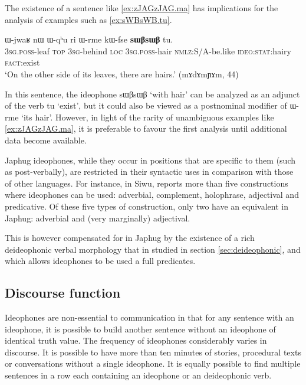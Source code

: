 \documentclass[oldfontcommands,oneside,a4paper,11pt]{article}
\newcommand{\ipa}[1]{{\phon \mbox{#1}}} %
\begin{document}
The existence of a sentence like \ref{ex:zJAGzJAG.ma}  has implications for the analysis of examples such as \ref{ex:sWBsWB.tu}.
    \begin{exe}
\ex \label{ex:sWBsWB.tu}
\gll 
   \ipa{ɯ-jwaʁ} 	\ipa{nɯ} 	\ipa{ɯ-qʰu} 	\ipa{ri} 	\ipa{ɯ-rme} 	\ipa{kɯ-fse} 	\ipa{\textbf{sɯβsɯβ}} 	\ipa{tu.} \\
   \textsc{3sg.poss}-leaf \textsc{top} \textsc{3sg}-behind \textsc{loc}    \textsc{3sg.poss}-hair \textsc{nmlz}:S/A-be.like \textsc{ideo:stat}:hairy \textsc{fact}:exist    \\
\glt `On the other side of its leaves, there are hairs.' (mɤdɤmɲɤm, 44)
\end{exe}

In this sentence, the ideophone \ipa{sɯβsɯβ}  `with hair' can be analyzed as an adjunct of the verb \ipa{tu} `exist', but it could also be viewed as a postnominal modifier of 	\ipa{ɯ-rme}  `its hair'. However, in light of the rarity of unambiguous examples like \ref{ex:zJAGzJAG.ma}, it is preferable to favour the first analysis until additional data become available.
 


Japhug ideophones, while they occur in positions that are specific to them (such as post-verbally), are  restricted in their syntactic uses in comparison with those of other languages. For instance, in Siwu, \citet{dingemanse14} reports more than five constructions where ideophones can be used: adverbial, complement, holophrase, adjectival and predicative. Of these five types of construction, only two have an equivalent in Japhug: adverbial and (very marginally) adjectival. 

This is however compensated  for in Japhug by the existence of a rich deideophonic verbal morphology that in studied in section \ref{sec:deideophonic}, and which allows ideophones to be used a full predicates.

\subsection{Discourse function}
  Ideophones are  non-essential to communication in that for any sentence with an ideophone, it is possible to build another sentence without an ideophone of identical truth value. The frequency of ideophones considerably varies  in discourse. It is possible to have more than ten minutes of stories, procedural texts or conversations without a single ideophone. It is equally possible to find  multiple sentences in a row each containing an ideophone or an deideophonic verb.
  
\end{document}
